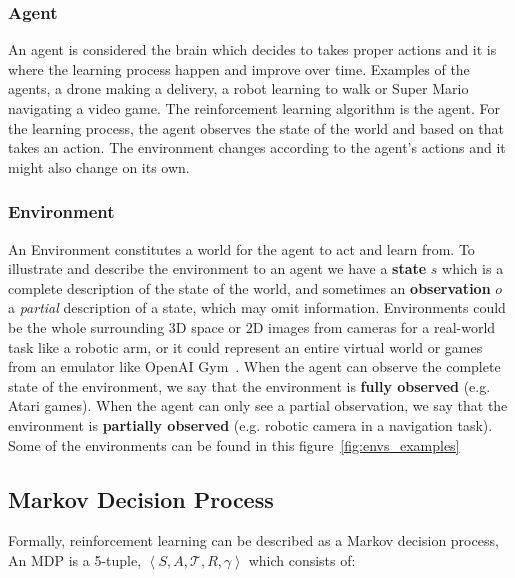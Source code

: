 \subsubsection{Agent}\label{Agent}

An agent is considered the brain which decides to takes proper actions and it is where the learning process happen and improve over time. Examples of the agents, a drone making a delivery, a robot learning to walk or Super Mario navigating a video game. The reinforcement learning algorithm is the agent. For the learning process, the agent observes the state of the world and based on that takes an action. The environment changes according to the agent's actions and it might also change on its own. 

\subsubsection{Environment}\label{Environment}

An Environment constitutes a world for the agent to act and learn from. 
To illustrate and describe the environment to an agent we have a \textbf{state} \(s\) which is a complete description of the state of the world, and sometimes an \textbf{observation} \(o\) a \textit{partial} description of a state, which may omit information. Environments could be the whole surrounding 3D space or 2D images from cameras for a real-world task like a robotic arm, or it could represent an entire virtual world or games from an emulator like OpenAI Gym~\parencite{brockman2016openai}. When the agent can observe the complete state of the environment, we say that the environment is \textbf{fully observed} (e.g. Atari games). When the agent can only see a partial observation, we say that the environment is \textbf{partially observed} (e.g. robotic camera in a navigation task).
Some of the environments can be found in this figure~\ref{fig:envs_examples}



\subsection{Markov Decision Process}

Formally, reinforcement learning can be described as a Markov decision process, An MDP is a 5-tuple, $ \left\langle S, A, \mathcal{T}, R, \gamma \right\rangle $ which consists of:

